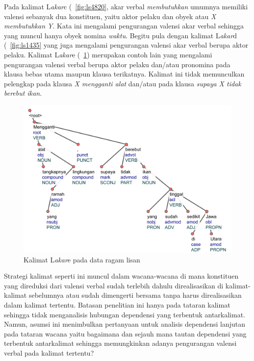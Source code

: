 Pada kalimat L\textit{akar}c (\pic~\ref{fig:ls4820}, akar verbal \textit{membutuhkan} umumnya memiliki valensi sebanyak dua konstituen, yaitu aktor pelaku dan obyek atau \textit{X membutuhkan Y}. Kata ini mengalami pengurangan valensi akar verbal sehingga yang muncul hanya obyek nomina \textit{waktu}. Begitu pula dengan kalimat L\textit{akar}d (\pic~\ref{fig:ls1435} yang juga mengalami pengurangan valensi akar verbal berupa aktor pelaku. Kalimat L\textit{akar}e (\pic~\ref{fig:ls1265}) merupakan contoh lain yang mengalami pengurangan valensi verbal berupa aktor pelaku dan/atau pronomina pada klausa bebas utama maupun klausa terikatnya. Kalimat ini tidak memunculkan pelengkap pada klausa \textit{X mengganti alat} dan/atau pada klausa \textit{supaya X tidak berebut ikan}.

\begin{figure}
	\centering \includegraphics[width=0.9
	\textwidth] {pics/ls1265.jpg} 
	\caption{Kalimat L\textit{akar}e pada data ragam lisan}
	\label{fig:ls1265} 
\end{figure}

Strategi kalimat seperti ini muncul dalam wacana-wacana di mana konstituen yang direduksi dari valensi verbal sudah terlebih dahulu direalisasikan di kalimat-kalimat sebelumnya atau sudah dimengerti bersama tanpa harus direalisasikan dalam kalimat tertentu. Batasan penelitian ini hanya pada tataran kalimat sehingga tidak menganalisis hubungan dependensi yang terbentuk antarkalimat. Namun, asumsi ini menimbulkan pertanyaan untuk analisis dependensi lanjutan pada tataran wacana yaitu bagaimana dan sejauh mana tautan dependensi yang terbentuk antarkalimat sehingga memungkinkan adanya pengurangan valensi verbal pada kalimat tertentu?

